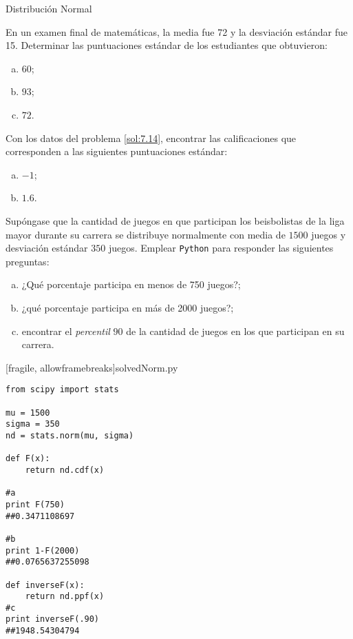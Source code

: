 {Distribución Normal}
 \begin{exmp}
  \label{sol:7.14}
  En un examen final de matemáticas, la media fue 72 y la desviación estándar fue 15. Determinar las puntuaciones estándar de los estudiantes que obtuvieron:
  \begin{enumerate}[(a)]
   \item $60$;
   \item $93$;
   \item $72$.
  \end{enumerate}

 \end{exmp}



 \begin{exmp}
  \label{sol:7.15}
  Con los datos del problema \ref{sol:7.14}, encontrar las calificaciones que corresponden a las siguientes puntuaciones estándar:
  \begin{enumerate}[(a)]
   \item $-1$;
   \item $1.6$.
  \end{enumerate}

 \end{exmp}



 \begin{exmp}
  \label{sol:7.16}
  Supóngase que la cantidad de juegos en que participan los beisbolistas de la liga mayor durante su carrera se distribuye normalmente con media de $1500$ juegos y desviación estándar $350$ juegos. Emplear \texttt{Python} para responder las siguientes preguntas:
  \begin{enumerate}[(a)]
   \item ¿Qué porcentaje participa en menos de 750 juegos?;
   \item ¿qué porcentaje participa en más de 2000 juegos?;
   \item encontrar el \emph{percentil} $90$ de la cantidad de juegos en los que participan en su carrera.
  \end{enumerate}

 \end{exmp}


[fragile, allowframebreaks]{solvedNorm.py}
 \begin{verbatim}
from scipy import stats

mu = 1500
sigma = 350
nd = stats.norm(mu, sigma)

def F(x):
    return nd.cdf(x)

#a
print F(750)
##0.3471108697

#b
print 1-F(2000)
##0.0765637255098

def inverseF(x):
    return nd.ppf(x)
#c
print inverseF(.90)
##1948.54304794
 \end{verbatim}


